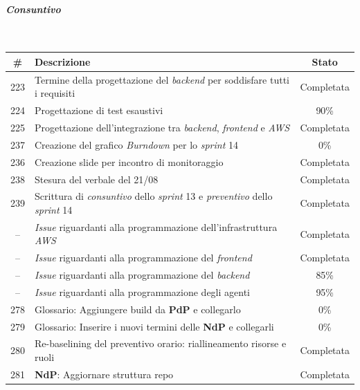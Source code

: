 \documentclass[12pt, a4paper]{article}
\begin{document}
{\paragraph{\textit{Consuntivo}}~

\begin{table}[H]
    \centering
    \renewcommand{\arraystretch}{1.3}
    \begin{tabularx}{\textwidth}{|c|X|c|}
        \hline
        \textbf{\#} & \textbf{Descrizione} & \textbf{Stato} \\ \hline
        223 & Termine della progettazione del \textit{backend} per soddisfare tutti i requisiti & Completata \\ \hline
        224 & Progettazione di test esaustivi & 90\% \\ \hline
        225 & Progettazione dell'integrazione tra \textit{backend}, \textit{frontend} e \textit{AWS} & Completata \\ \hline
        237 & Creazione del grafico \textit{Burndown} per lo \textit{sprint} 14 & 0\% \\ \hline
        236 & Creazione slide per incontro di monitoraggio & Completata \\ \hline
        238 & Stesura del verbale del 21/08 & Completata \\ \hline
        239 & Scrittura di \textit{consuntivo} dello \textit{sprint} 13 e \textit{preventivo} dello \textit{sprint} 14 & Completata \\ \hline
        -- & \textit{Issue} riguardanti alla programmazione dell'infrastruttura \textit{AWS} & Completata \\ \hline
        -- & \textit{Issue} riguardanti alla programmazione del \textit{frontend} & Completata \\ \hline
        -- & \textit{Issue} riguardanti alla programmazione del \textit{backend} & 85\% \\ \hline
        -- & \textit{Issue} riguardanti alla programmazione degli agenti & 95\% \\ \hline
        278 & Glossario: Aggiungere build da \textbf{PdP} e collegarlo & 0\% \\ \hline
        279 & Glossario: Inserire i nuovi termini delle \textbf{NdP} e collegarli & 0\% \\ \hline
        280 & Re-baselining del preventivo orario: riallineamento risorse e ruoli & Completata \\ \hline
        281 & \textbf{NdP}: Aggiornare struttura repo & Completata \\ \hline

\end{tabularx}
\end{table}}
\end{document}
